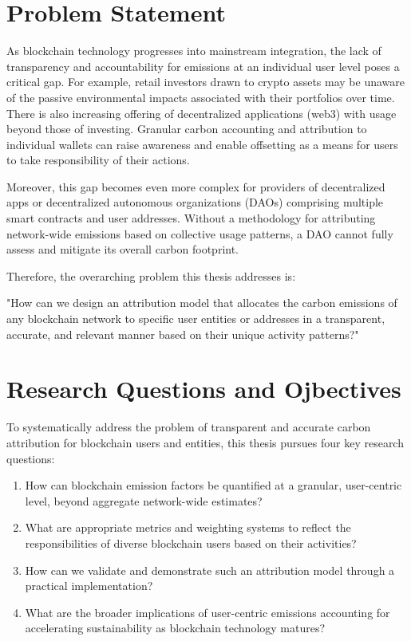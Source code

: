 \documentclass[11pt]{report}
\begin{document}
\section{Problem Statement}

As blockchain technology progresses into mainstream integration, the lack of transparency and accountability for emissions at an individual user level poses a critical gap. For example, retail investors drawn to crypto assets may be unaware of the passive environmental impacts associated with their portfolios over time. There is also increasing offering of decentralized applications (web3) with usage beyond those of investing. Granular carbon accounting and attribution to individual wallets can raise awareness and enable offsetting as a means for users to take responsibility of their actions.

Moreover, this gap becomes even more complex for providers of decentralized apps or decentralized autonomous organizations (DAOs) comprising multiple smart contracts and user addresses. Without a methodology for attributing network-wide emissions based on collective usage patterns, a DAO cannot fully assess and mitigate its overall carbon footprint.

Therefore, the overarching problem this thesis addresses is:

"How can we design an attribution model that allocates the carbon emissions of any blockchain network to specific user entities or addresses in a transparent, accurate, and relevant manner based on their unique activity patterns?"

\section{Research Questions and Ojbectives}

To systematically address the problem of transparent and accurate carbon attribution for blockchain users and entities, this thesis pursues four key research questions:

\begin{enumerate}
    \item How can blockchain emission factors be quantified at a granular, user-centric level, beyond aggregate network-wide estimates?
    \item What are appropriate metrics and weighting systems to reflect the responsibilities of diverse blockchain users based on their activities?
    \item How can we validate and demonstrate such an attribution model through a practical implementation?
    \item What are the broader implications of user-centric emissions accounting for accelerating sustainability as blockchain technology matures?
\end{enumerate}
\end{document}
